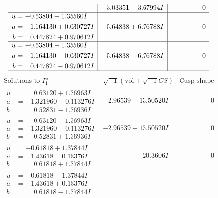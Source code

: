 \documentclass[1p]{elsarticle_modified}
\theoremstyle{definition}
\newcommand{\I}{\sqrt{-1}}
\begin{document}
$$\begin{array}{c|c|c}
 & \phantom{-}3.03351 - 3.67994 I & \phantom{-0.000000 } 0 \\ \hline\begin{aligned}
u &= -0.63804 + 1.35560 I \\
a &= -1.164130 + 0.030727 I \\
b &= \phantom{-}0.447824 + 0.970612 I\end{aligned}
 & \phantom{-}5.64838 + 6.76788 I & \phantom{-0.000000 } 0 \\ \hline\begin{aligned}
u &= -0.63804 - 1.35560 I \\
a &= -1.164130 - 0.030727 I \\
b &= \phantom{-}0.447824 - 0.970612 I\end{aligned}
 & \phantom{-}5.64838 - 6.76788 I & \phantom{-0.000000 } 0\\
 \hline 
 \end{array}$$\newpage$$\begin{array}{c|c|c}  
\text{Solutions to }I^u_{1}& \I (\text{vol} + \sqrt{-1}CS) & \text{Cusp shape}\\
 \hline 
\begin{aligned}
u &= \phantom{-}0.63120 + 1.36963 I \\
a &= -1.321960 + 0.113276 I \\
b &= \phantom{-}0.52831 - 1.36936 I\end{aligned}
 & -2.96539 - 13.50520 I & \phantom{-0.000000 } 0 \\ \hline\begin{aligned}
u &= \phantom{-}0.63120 - 1.36963 I \\
a &= -1.321960 - 0.113276 I \\
b &= \phantom{-}0.52831 + 1.36936 I\end{aligned}
 & -2.96539 + 13.50520 I & \phantom{-0.000000 } 0 \\ \hline\begin{aligned}
u &= -0.61818 + 1.37844 I \\
a &= -1.43618 - 0.18376 I \\
b &= \phantom{-}0.61818 + 1.37844 I\end{aligned}
 & \phantom{-0.000000 -}20.3606 I & \phantom{-0.000000 } 0 \\ \hline\begin{aligned}
u &= -0.61818 - 1.37844 I \\
a &= -1.43618 + 0.18376 I \\
b &= \phantom{-}0.61818 - 1.37844 I\end{aligned}

\end{array}$$
\end{document}
